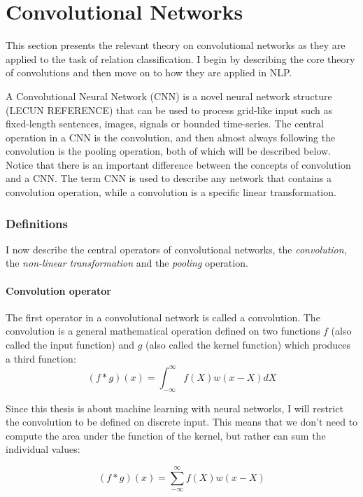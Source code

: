

\section{Convolutional Networks}

This section presents the relevant theory on convolutional networks as they are applied to the task of relation classification. I begin by describing the core theory of convolutions and then move on to how they are applied in NLP. 

A Convolutional Neural Network (CNN) is a novel neural network structure (LECUN REFERENCE) that can be used to process grid-like input such as fixed-length sentences, images, signals or bounded time-series. The central operation in a CNN is the convolution, and then almost always following the convolution is the pooling operation, both of which will be described below. Notice that there is an important difference between the concepts of convolution and a CNN. The term CNN is used to describe any network that contains a convolution operation, while a convolution is a specific linear transformation. 

\subsubsection{Definitions}

I now describe the central operators of convolutional networks, the \emph{convolution}, the \emph{non-linear transformation} and the \emph{pooling} operation. 


\paragraph{Convolution operator}

The first operator in a convolutional network is called a convolution. The convolution is a general mathematical operation defined on two functions $f$ (also called the input function) and $g$ (also called the kernel function) which produces a third function:
$$
(f * g) (x) = \int_{-\infty}^{\infty} f(X)w(x-X)dX
$$ 

Since this thesis is about machine learning with neural networks, I will restrict the convolution to be defined on discrete input. This means that we don't need to compute the area under the function of the kernel, but rather can sum the individual values:

$$
(f * g) (x) = \sum_{-\infty}^{\infty} f(X)w(x-X)
$$

